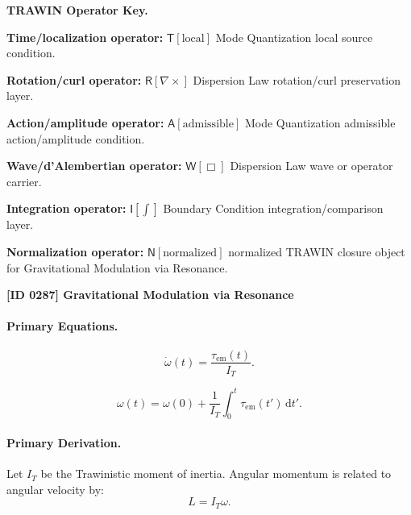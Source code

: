 \par\vspace{0.45\baselineskip}
\noindent\begin{minipage}[t]{\linewidth}
\begingroup
\small
\raggedright
\textbf{TRAWIN Operator Key.}\par
\noindent\textbf{Time/localization operator:} $\mathsf{T}\!\left[\mathrm{local}\right]$ Mode Quantization local source condition.\par
\noindent\textbf{Rotation/curl operator:} $\mathsf{R}\!\left[\nabla\times\right]$ Dispersion Law rotation/curl preservation layer.\par
\noindent\textbf{Action/amplitude operator:} $\mathsf{A}\!\left[\mathrm{admissible}\right]$ Mode Quantization admissible action/amplitude condition.\par
\noindent\textbf{Wave/d'Alembertian operator:} $\mathsf{W}\!\left[\Box\right]$ Dispersion Law wave or operator carrier.\par
\noindent\textbf{Integration operator:} $\mathsf{I}\!\left[\int\right]$ Boundary Condition integration/comparison layer.\par
\noindent\textbf{Normalization operator:} $\mathsf{N}\!\left[\mathrm{normalized}\right]$ normalized TRAWIN closure object for Gravitational Modulation via Resonance.\par
\endgroup
\end{minipage}

\clearpage
\noindent\textbf{[ID 0287] Gravitational Modulation via Resonance}\par
\vspace{0.35em}
\paragraph{Primary Equations.}
\begin{equation}
\dot{\omega}(t)
=
\frac{\tau_{\mathrm{em}}(t)}{I_T}.
\end{equation}

\begin{equation}
\omega(t)
=
\omega(0)
+
\frac{1}{I_T}
\int_0^t
\tau_{\mathrm{em}}(t')
\,\mathrm{d}t' .
\end{equation}

\paragraph{Primary Derivation.}
Let $I_T$ be the Trawinistic moment of inertia.  
Angular momentum is related to angular velocity by:
\begin{equation}
L=I_T\omega .
\end{equation}

